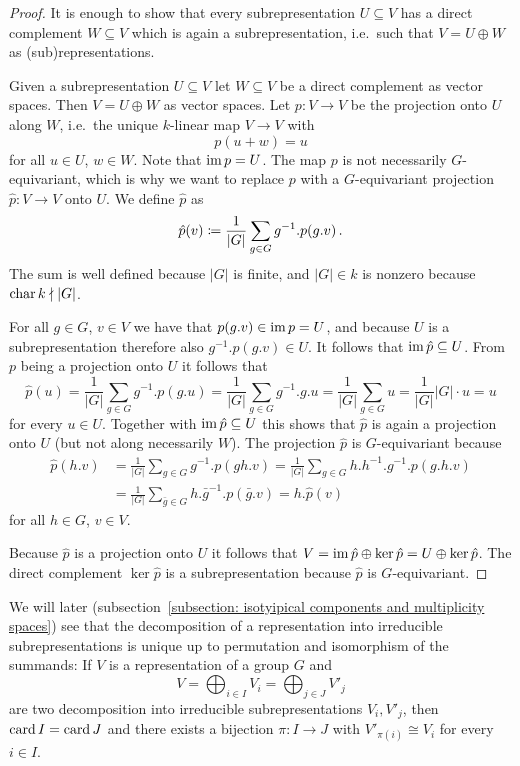 \begin{proof}
  It is enough to show that every subrepresentation $U \subseteq V$ has a direct complement $W \subseteq V$ which is again a subrepresentation, i.e.\ such that $V = U \oplus W$ as (sub)representations.
  
  Given a subrepresentation $U \subseteq V$ let $W \subseteq V$ be a direct complement as vector spaces.
  Then $V = U \oplus W$ as vector spaces.
  Let $p \colon V \to V$ be the projection onto $U$ along $W$, i.e.\ the unique $k$-linear map $V \to V$ with
  \[
      p(u + w)
    = u
  \]
  for all $u \in U$, $w \in W$.
  Note that $\operatorname{im} p = U$.
  The map $p$ is not necessarily $G$-equivariant, which is why we want to replace $p$ with a $G$-equivariant projection $\hat{p} \colon V \to V$ onto $U$.
  We define $\hat{p}$ as
  \[
              \hat{p}(v)
    \coloneqq  \frac{1}{|G|} \sum_{g \in G} g^{-1}.p(g.v) \,.
  \]
  The sum is well defined because $|G|$ is finite, and $|G| \in k$ is nonzero because $\operatorname{char} k \nmid |G|$.
  
  For all $g \in G$, $v \in V$ we have that $p(g.v) \in \operatorname{im} p = U$, and because $U$ is a subrepresentation therefore also $g^{-1}.p(g.v) \in U$.
  It follows that $\operatorname{im} \hat{p} \subseteq U$.
  From $p$ being a projection onto $U$ it follows that
  \[
      \hat{p}(u)
    = \frac{1}{|G|} \sum_{g \in G} g^{-1}.p(g.u)
    = \frac{1}{|G|} \sum_{g \in G} g^{-1}.g.u
    = \frac{1}{|G|} \sum_{g \in G} u
    = \frac{1}{|G|} |G| \cdot u
    = u
  \]
  for every $u \in U$.
  Together with $\operatorname{im} \hat{p} \subseteq U$ this shows that $\hat{p}$ is again a projection onto $U$ (but not along necessarily $W$).
  The projection $\hat{p}$ is $G$-equivariant because 
  \begin{align*}
        \hat{p}(h.v)
    &=  \frac{1}{|G|} \sum_{g \in G} g^{-1}.p(gh.v)
     =  \frac{1}{|G|} \sum_{g \in G} h.h^{-1}.g^{-1}.p(g.h.v) \\
    &=  \frac{1}{|G|} \sum_{\bar{g} \in G} h.\bar{g}^{-1}.p(\bar{g}.v)
     =  h.\hat{p}(v)
  \end{align*}
  for all $h \in G$, $v \in V$.
  
  Because $\hat{p}$ is a projection onto $U$ it follows that $V = \operatorname{im} \hat{p} \oplus \ker \hat{p} = U \oplus \ker \hat{p}$.
  The direct complement $\ker \hat{p}$ is a subrepresentation because $\hat{p}$ is $G$-equivariant.
\end{proof}


\begin{remark}
  We will later (subsection~\ref{subsection: isotyipical components and multiplicity spaces}) see that the decomposition of a representation into irreducible subrepresentations is unique up to permutation and isomorphism of the summands:
  If $V$ is a representation of a group $G$ and
  \[
      V
    = \bigoplus_{i \in I} V_i
    = \bigoplus_{j \in J} V'_j
  \]
  are two decomposition into irreducible subrepresentations $V_i, V'_j$, then $\operatorname{card}{I} = \operatorname{card}{J}$ and there exists a bijection $\pi \colon I \to J$ with $V'_{\pi(i)} \cong V_i$ for every $i \in I$.
\end{remark}


